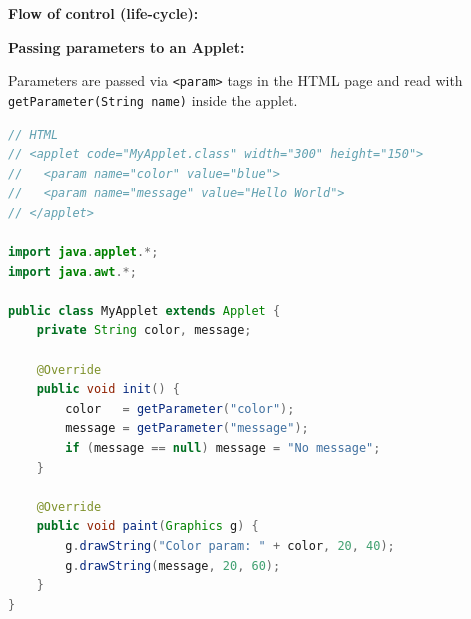 \documentclass[12pt,a3paper]{article}
\begin{document}
\begin{enumerate}
\begin{tcolorbox}
\textbf{Flow of control (life-cycle):}

\begin{center}
\end{center}

\textbf{Passing parameters to an Applet:}

Parameters are passed via \texttt{<param>} tags in
the HTML page and read with
\texttt{getParameter(String name)} inside the applet.

\begin{lstlisting}[language=Java]
// HTML
// <applet code="MyApplet.class" width="300" height="150">
//   <param name="color" value="blue">
//   <param name="message" value="Hello World">
// </applet>

import java.applet.*;
import java.awt.*;

public class MyApplet extends Applet {
    private String color, message;

    @Override
    public void init() {
        color   = getParameter("color");
        message = getParameter("message");
        if (message == null) message = "No message";
    }

    @Override
    public void paint(Graphics g) {
        g.drawString("Color param: " + color, 20, 40);
        g.drawString(message, 20, 60);
    }
}
\end{lstlisting}

\end{tcolorbox}






\end{enumerate}
\end{document}
